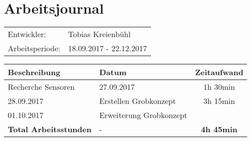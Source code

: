 \documentclass[a4paper, 10pt, fleqn]{article}
\begin{document}
	\section*{Arbeitsjournal}
    \begin{tabular}{ll}
        Entwickler: & Tobias Kreienbühl \\
        Arbeitsperiode: & 18.09.2017 - 22.12.2017\\
    \end{tabular}

	\begin{table}[H]
		\centering
		\begin{tabular}{p{9cm}|p{3cm}|c}
			\textbf{Beschreibung}
			&
            \textbf{Datum}
            &
			\textbf{Zeitaufwand}\\\toprule
			Recherche Sensoren 
			&
			27.09.2017
			&
			1h 30min\\\midrule
            28.09.2017
            &
            Erstellen Grobkonzept
            &
            3h 15min\\\midrule
            01.10.2017
            &
            Erweiterung Grobkonzept
            &
            \\\midrule
			\textbf{Total Arbeitsstunden}
			&
            -
            &
			\textbf{4h 45min}\\\midrule\bottomrule
		\end{tabular}
	\end{table}
\end{document}

